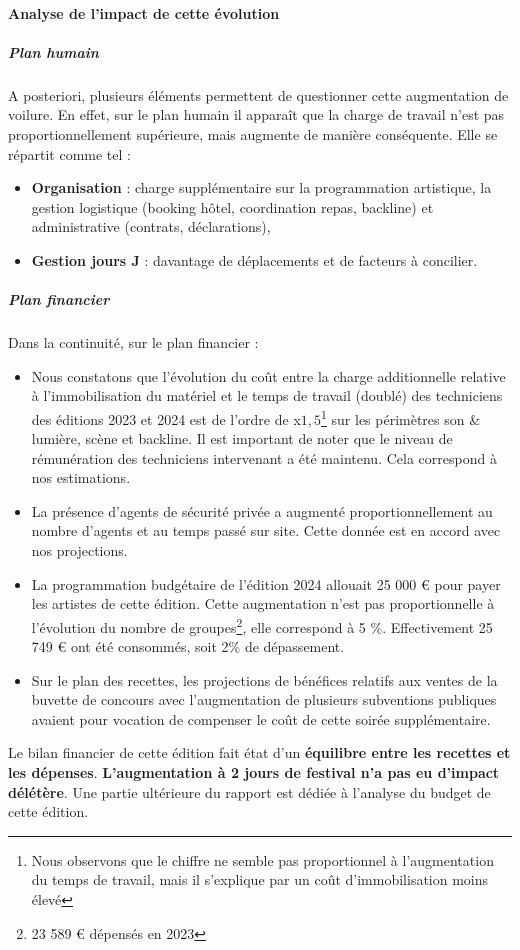 \documentclass[12pt,a4paper]{report}
\begin{document}
\paragraph{Analyse de l'impact de cette évolution}
\subparagraph{Plan humain}
A posteriori, plusieurs éléments permettent de questionner cette augmentation de voilure. En effet, sur le plan humain il apparaît que la charge de travail n'est pas proportionnellement supérieure, mais augmente de manière conséquente. Elle se répartit comme tel : 
\begin{itemize}
\item \textbf{Organisation} : charge supplémentaire sur la programmation artistique, la gestion logistique (booking hôtel, coordination repas, backline) et administrative (contrats, déclarations),
\item \textbf{Gestion jours J} : davantage de déplacements et de facteurs à concilier.
\end{itemize}

\subparagraph{Plan financier}
Dans la continuité, sur le plan financier :
\begin{itemize}
\item Nous constatons que l'évolution du coût entre la charge additionnelle relative à l'immobilisation du matériel et le temps de travail (doublé) des techniciens des éditions 2023 et 2024 est de l'ordre de x$1,5$\footnote{Nous observons que le chiffre ne semble pas proportionnel à l'augmentation du temps de travail, mais il s'explique par un coût d'immobilisation moins élevé} sur les périmètres son \& lumière, scène et backline. Il est important de noter que le niveau de rémunération des techniciens intervenant a été maintenu. Cela correspond à nos estimations.
\item La présence d'agents de sécurité privée a augmenté proportionnellement au nombre d'agents et au temps passé sur site. Cette donnée est en accord avec nos projections.
\item La programmation budgétaire de l'édition 2024 allouait 25 000 € pour payer les artistes de cette édition. Cette augmentation n'est pas proportionnelle à l'évolution du nombre de groupes\footnote{23 589 € dépensés en 2023}, elle correspond à 5 \%. Effectivement 25 749 € ont été consommés, soit 2\% de dépassement.
\item Sur le plan des recettes, les projections de bénéfices relatifs aux ventes de la buvette de concours avec l'augmentation de plusieurs subventions publiques avaient pour vocation de compenser le coût de cette soirée supplémentaire.\\
\end{itemize}
Le bilan financier de cette édition fait état d'un \textbf{équilibre entre les recettes et les dépenses}. \textbf{L'augmentation à 2 jours de festival n'a pas eu d'impact délétère}. Une partie ultérieure du rapport est dédiée à l'analyse du budget de cette édition.
\end{document}

